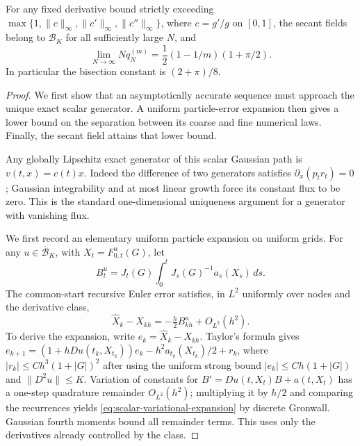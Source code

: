 \begin{theorem}
\label{thm:sharp-minimax-proof}
For any fixed derivative bound strictly exceeding
$\max\{1,\|c\|_\infty,\|c'\|_\infty,\|c''\|_\infty\}$,
where $c=g'/g$ on $[0,1]$, the secant fields belong to $\mathcal B_K$ for
all sufficiently large $N$, and
\begin{equation}
 \lim_{N\to\infty}Nq_N^{(m)}
 =\frac12(1-1/m)(1+\pi/2).
 \label{eq:sharp-minimax}
\end{equation}
In particular the bisection constant is $(2+\pi)/8$.
\end{theorem}
\begin{proof}
We first show that an asymptotically accurate sequence must approach the
unique exact scalar generator. A uniform particle-error expansion then gives
a lower bound on the separation between its coarse and fine numerical laws.
Finally, the secant field attains that lower bound.

Any globally Lipschitz exact generator of this scalar Gaussian path is
$v(t,x)=c(t)x$. Indeed the difference of two generators satisfies
$\partial_x(p_tr_t)=0$; Gaussian integrability and at most linear growth
force its constant flux to be zero. This is the standard one-dimensional uniqueness argument for a generator
with vanishing flux.

We first record an elementary uniform particle expansion on uniform grids.
For any $u\in\overline{\mathcal B}_K$, with $X_t=F^u_{0,t}(G)$, let
\[
 B_t^u=J_t(G)\int_0^tJ_s(G)^{-1}a_s(X_s)\,ds.
\]
The common-start recursive Euler error satisfies, in $L^2$ uniformly over
nodes and the derivative class,
\begin{equation}
 \widehat X_k-X_{kh}=-\tfrac h2 B_{kh}^u+O_{L^2}(h^2).
 \label{eq:scalar-variational-expansion}
\end{equation}
To derive the expansion, write $e_k=\widehat X_k-X_{kh}$. Taylor's
formula gives
$e_{k+1}=(1+hDu(t_k,X_{t_k}))e_k-h^2a_{t_k}(X_{t_k})/2+r_k$,
where $|r_k|\le C h^3(1+|G|)^2$ after using the uniform strong bound
$|e_k|\le Ch(1+|G|)$ and $\|D^2u\|\le K$.
Variation of constants for $B'=Du(t,X_t)B+a(t,X_t)$ has a one-step
quadrature remainder $O_{L^2}(h^2)$; multiplying it by $h/2$ and comparing
the recurrences yields \eqref{eq:scalar-variational-expansion} by discrete
Gronwall. Gaussian fourth moments bound all remainder terms. This uses
only the derivatives already controlled by the class.


\end{proof}

